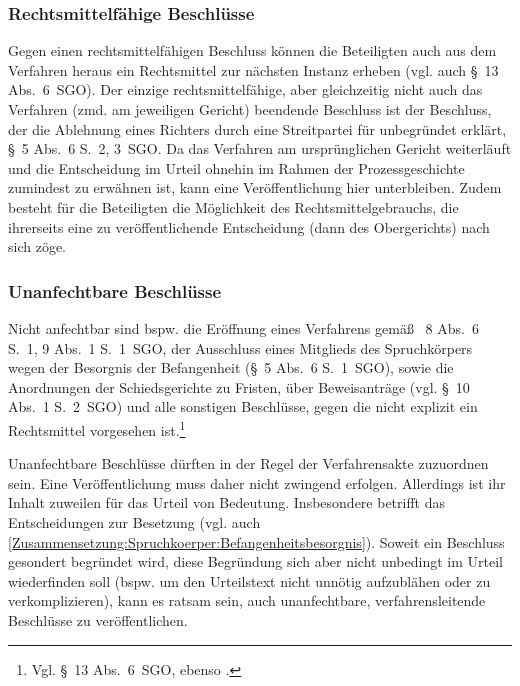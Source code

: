 \subsubsection{Rechtsmittelfähige Beschlüsse}
\label{Dokumentation:Beschlüsse:Verfahrensleitend:Rechtsmittelfähig}
Gegen einen rechtsmittelfähigen Beschluss können die Beteiligten auch aus dem Verfahren heraus ein Rechtsmittel zur nächsten Instanz erheben (vgl. auch \S~13 Abs.~6~SGO).
Der einzige rechtsmittelfähige, aber gleichzeitig nicht auch das Verfahren (zmd. am jeweiligen  Gericht) beendende Beschluss ist der Beschluss, der die Ablehnung eines Richters durch eine Streitpartei für unbegründet erklärt, \S~5 Abs.~6 S.~2, 3~SGO.
Da das Verfahren am ursprünglichen Gericht weiterläuft und die Entscheidung im Urteil ohnehin im Rahmen der Prozessgeschichte zumindest zu erwähnen ist, kann eine Veröffentlichung hier unterbleiben.
Zudem besteht für die Beteiligten die Möglichkeit des Rechtsmittelgebrauchs, die ihrerseits eine zu veröffentlichende Entscheidung (dann des Obergerichts) nach sich zöge. 

\subsubsection{Unanfechtbare Beschlüsse}
\label{Dokumentation:Beschlüsse:Verfahrensleitend:Unanfechtbar}
Nicht anfechtbar sind bspw. die Eröffnung eines Verfahrens gemäß \SSS~8 Abs.~6 S.~1, 9 Abs.~1 S.~1~SGO, der Ausschluss eines Mitglieds des Spruchkörpers wegen der Besorgnis der Befangenheit (\S~5 Abs.~6 S.~1~SGO), sowie die Anordnungen der Schiedsgerichte zu Fristen, über Beweisanträge (vgl. \S~10 Abs.~1 S.~2~SGO) und alle sonstigen Beschlüsse, gegen die nicht explizit ein Rechtsmittel vorgesehen ist.\footnote{Vgl. \S~13 Abs.~6~SGO, ebenso \cite[5]{LSGBB147}.}

Unanfechtbare Beschlüsse dürften in der Regel der Verfahrensakte zuzuordnen sein.
Eine Veröffentlichung muss daher nicht zwingend erfolgen.
Allerdings ist ihr Inhalt zuweilen für das Urteil von Bedeutung.
Insbesondere betrifft das Entscheidungen zur Besetzung (vgl. auch \ref{Zusammensetzung:Spruchkoerper:Befangenheitsbesorgnis}).
Soweit ein Beschluss gesondert begründet wird, diese Begründung sich aber nicht unbedingt im Urteil wiederfinden soll (bspw. um den Urteilstext nicht unnötig aufzublähen oder zu verkomplizieren), kann es ratsam sein, auch unanfechtbare, verfahrensleitende Beschlüsse zu veröffentlichen.

